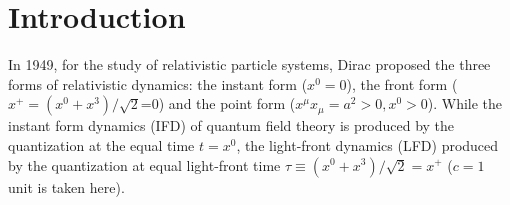 \documentclass[%
 reprint,
superscriptaddress,
 amsmath,amssymb,
 aps,
]{revtex4-2}
\begin{document}

\maketitle


\section{Introduction}
\label{sec:introduction}

In 1949, for the study of relativistic particle systems, Dirac \cite{Dirac1949} proposed the three forms of relativistic dynamics: the instant form ($x^{0}=0$), the front form ($x^{+}=(x^{0}+x^{3})/\sqrt{2}$=0) and the point form ($x^{\mu}x_{\mu}=a^{2}>0, x^{0}>0$).
While the instant form dynamics (IFD) of quantum field theory is produced by the quantization at the equal time $t=x^{0}$, the light-front dynamics (LFD) produced by the quantization at equal light-front time $\tau \equiv (x^{0}+x^{3})/\sqrt{2}=x^{+}$ ($c=1$ unit is taken here).
\end{document}
